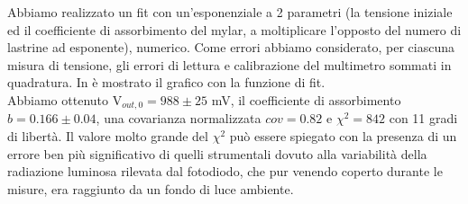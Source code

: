 Abbiamo realizzato un fit con un'esponenziale a 2 parametri (la tensione iniziale ed il coefficiente di assorbimento del mylar, a moltiplicare l'opposto del numero di lastrine ad esponente), numerico. Come errori abbiamo considerato, per ciascuna misura di tensione, gli errori di lettura e calibrazione del multimetro sommati in quadratura. In  è mostrato il grafico con la funzione di fit.\\
Abbiamo ottenuto V$_{out,0} = 988 \pm 25$ mV, il coefficiente di assorbimento $b = 0.166 \pm 0.04$, una covarianza normalizzata $cov = 0.82$ e $\chi^2 = 842$ con 11 gradi di libertà. Il valore molto grande del $\chi^2$ può essere spiegato con la presenza di un errore ben più significativo di quelli strumentali dovuto alla variabilità della radiazione luminosa rilevata dal fotodiodo, che pur venendo coperto durante le misure, era raggiunto da un fondo di luce ambiente.
